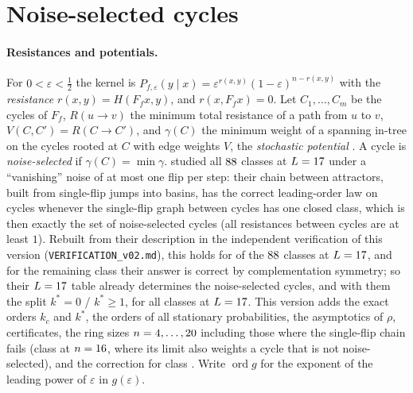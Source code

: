 \documentclass[11pt,a4paper]{article}
\theoremstyle{remark}
\newcommand{\eps}{\varepsilon}
\begin{document}
\section{Noise-selected cycles}\label{sec:fw}

\paragraph{Resistances and potentials.} For $0<\eps<\tfrac12$ the kernel is $P_{f,\eps}(y\mid x)=\eps^{r(x,y)}(1-\eps)^{n-r(x,y)}$ with the \emph{resistance} $r(x,y)=H(F_fx,y)$, and $r(x,F_fx)=0$. Let $C_1,\dots,C_m$ be the cycles of $F_f$, $R(u\to v)$ the minimum total resistance of a path from $u$ to $v$, $V(C,C')=R(C\to C')$, and $\gamma(C)$ the minimum weight of a spanning in-tree on the cycles rooted at $C$ with edge weights $V$, the \emph{stochastic potential} \citep{Young1993}. A cycle is \emph{noise-selected} if $\gamma(C)=\min\gamma$. \citet{Bagnoli2024} studied all $88$ classes at $L=17$ under a ``vanishing'' noise of at most one flip per step: their chain between attractors, built from single-flip jumps into basins, has the correct leading-order law on cycles whenever the single-flip graph between cycles has one closed class, which is then exactly the set of noise-selected cycles (all resistances between cycles are at least $1$). Rebuilt from their description in the independent verification of this version (\texttt{VERIFICATION\_v02.md}), this holds for \BBMOneClosed{} of the $88$ classes at $L=17$, and for the remaining class \BBMSymRules{} their answer is correct by complementation symmetry; so their $L=17$ table already determines the noise-selected cycles, and with them the split $k^*=0$ / $k^*\ge1$, for all classes at $L=17$. This version adds the exact orders $k_c$ and $k^*$, the orders of all stationary probabilities, the asymptotics of $\rho$, certificates, the ring sizes $n=4,\dots,20$ including those where the single-flip chain fails (class \BBMFailRules{} at $n=16$, where its limit also weights a cycle that is not noise-selected), and the correction for class \FlipRules. Write $\operatorname{ord}g$ for the exponent of the leading power of $\eps$ in $g(\eps)$.
\end{document}
